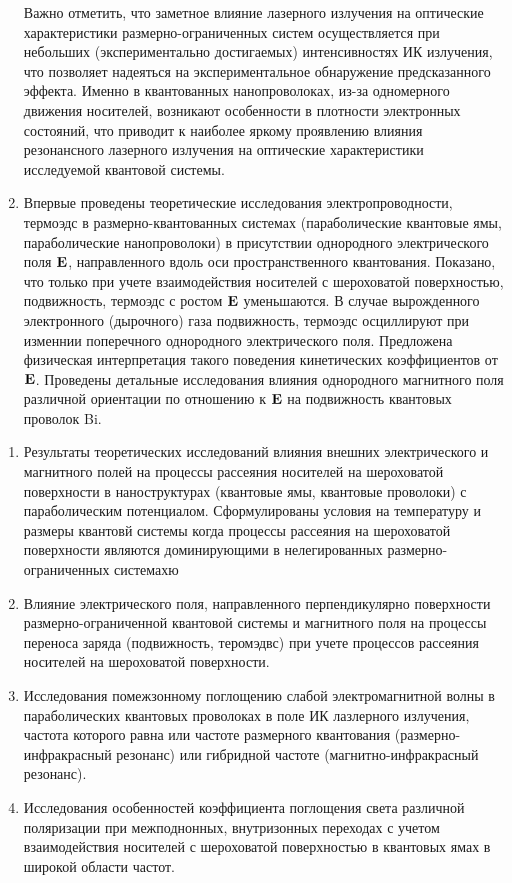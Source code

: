 \begin{enumerate}
	Важно отметить, что заметное влияние лазерного излучения на оптические характеристики размерно-ограниченных систем осуществляется при небольших (экспериментально достигаемых) интенсивностях ИК излучения, что позволяет надеяться на экспериментальное обнаружение предсказанного эффекта. Именно в квантованных нанопроволоках, из-за одномерного движения носителей, возникают особенности в плотности электронных состояний, что приводит к наиболее яркому проявлению влияния резонансного лазерного излучения на оптические характеристики исследуемой квантовой системы.
	\item Впервые проведены теоретические исследования электропроводности, термоэдс в размерно-квантованных системах (параболические квантовые ямы, параболические нанопроволоки) в присутствии однородного электрического поля $\boldsymbol{\mathbf{E}}$, направленного вдоль оси пространственного квантования. 
	Показано, что только при учете взаимодействия носителей с шероховатой поверхностью, подвижность, термоэдс с ростом $\boldsymbol{\mathbf{E}}$ уменьшаются. В случае вырожденного электронного (дырочного) газа подвижность, термоэдс осциллируют при изменнии поперечного однородного электрического поля. Предложена физическая интерпретация такого поведения кинетических коэффициентов от  $\boldsymbol{\mathbf{E}}$. Проведены детальные исследования влияния однородного магнитного поля различной ориентации по отношению к $\boldsymbol{\mathbf{E}}$ на подвижность квантовых проволок Bi.
\end{enumerate}

{}
\begin{enumerate}
	\item Результаты теоретических исследований влияния внешних электрического и магнитного полей на процессы рассеяния носителей на шероховатой поверхности в наноструктурах (квантовые ямы, квантовые проволоки) с параболическим потенциалом. Сформулированы условия на температуру и размеры квантовй системы когда процессы рассеяния на шероховатой поверхности являются доминирующими в нелегированных размерно-ограниченных системахю
	\item Влияние электрического поля, направленного перпендикулярно поверхности размерно-ограниченной квантовой системы и магнитного поля на процессы переноса заряда (подвижность, теромэдвс) при учете процессов рассеяния носителей на шероховатой поверхности.
	\item Исследования помежзонному поглощению слабой электромагнитной волны в параболических квантовых проволоках в поле ИК лазлерного излучения, частота которого равна или частоте размерного квантования (размерно-инфракрасный резонанс) или гибридной частоте (магнитно-инфракрасный резонанс).
	\item Исследования особенностей коэффициента поглощения света различной поляризации при межподнонных, внутризонных переходах с учетом взаимодействия носителей с шероховатой поверхностью в квантовых ямах в широкой области частот.
\end{enumerate}

